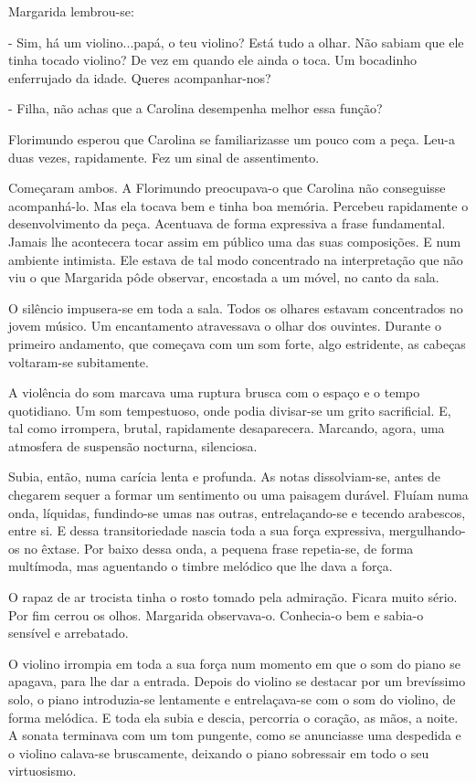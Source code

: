 Margarida lembrou-se:

- Sim, há um violino...papá, o teu violino? Está tudo a olhar. Não
sabiam que ele tinha tocado violino? De vez em quando ele ainda o toca.
Um bocadinho enferrujado da idade. Queres acompanhar-nos?

- Filha, não achas que a Carolina desempenha melhor essa função?

Florimundo esperou que Carolina se familiarizasse um pouco com a peça.
Leu-a duas vezes, rapidamente. Fez um sinal de assentimento.

Começaram ambos. A Florimundo preocupava-o que Carolina não conseguisse
acompanhá-lo. Mas ela tocava bem e tinha boa memória. Percebeu
rapidamente o desenvolvimento da peça. Acentuava de forma expressiva a
frase fundamental. Jamais lhe acontecera tocar assim em público uma das
suas composições. E num ambiente intimista. Ele estava de tal modo
concentrado na interpretação que não viu o que Margarida pôde observar,
encostada a um móvel, no canto da sala.

O silêncio impusera-se em toda a sala. Todos os olhares estavam
concentrados no jovem músico. Um encantamento atravessava o olhar dos
ouvintes. Durante o primeiro andamento, que começava com um som forte,
algo estridente, as cabeças voltaram-se subitamente.

A violência do som marcava uma ruptura brusca com o espaço e o tempo
quotidiano. Um som tempestuoso, onde podia divisar-se um grito
sacrificial. E, tal como irrompera, brutal, rapidamente desaparecera.
Marcando, agora, uma atmosfera de suspensão nocturna, silenciosa.

Subia, então, numa carícia lenta e profunda. As notas dissolviam-se,
antes de chegarem sequer a formar um sentimento ou uma paisagem durável.
Fluíam numa onda, líquidas, fundindo-se umas nas outras, entrelaçando-se
e tecendo arabescos, entre si. E dessa transitoriedade nascia toda a sua
força expressiva, mergulhando-os no êxtase. Por baixo dessa onda, a
pequena frase repetia-se, de forma multímoda, mas aguentando o timbre
melódico que lhe dava a força.

O rapaz de ar trocista tinha o rosto tomado pela admiração. Ficara muito
sério. Por fim cerrou os olhos. Margarida observava-o. Conhecia-o bem e
sabia-o sensível e arrebatado.

O violino irrompia em toda a sua força num momento em que o som do piano
se apagava, para lhe dar a entrada. Depois do violino se destacar por um
brevíssimo solo, o piano introduzia-se lentamente e entrelaçava-se com o
som do violino, de forma melódica. E toda ela subia e descia, percorria
o coração, as mãos, a noite. A sonata terminava com um tom pungente,
como se anunciasse uma despedida e o violino calava-se bruscamente,
deixando o piano sobressair em todo o seu virtuosismo.

